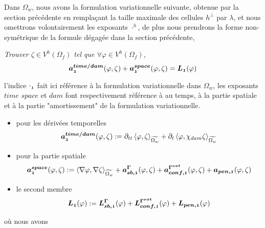 \noindent Dans $\Omega_w$, nous avons la formulation variationnelle suivante, obtenue par la section précédente en remplaçant la taille maximale des cellules $h^{\perp}$ par $\lambda$, et nous omettrons volontairement les exposants $\cdot^h$, de plus nous prendrons la forme non-symétrique de la formule dégagée dans la section précédente,

\begin{refe}
\noindent \textit{Trouver $\zeta\in V^h (\Omega_f)$ tel que $\forall \varphi \in V^h (\Omega_f)$,}
	\begin{equation}
	\boldsymbol{a^{time/dam}_{\mathfrak{1}}}(\varphi, \zeta) + \boldsymbol{a^{space}_{\mathfrak{1}}}(\varphi, \zeta) = \boldsymbol{L_{\mathfrak{1}}}(\varphi)
	\end{equation}
\end{refe}
l'indice $\cdot_{\mathfrak{1}}$ fait ici référence à la formulation variationnelle dans $\Omega_w$, les exposants $time$ $space$ et $dam$ font respectivement référence à au temps, à la partie spatiale et à la partie "amortissement" de la formulation variationnelle.
\begin{itemize}[label=$\mybullet$]
\item pour les dérivées temporelles
\begin{equation}
	\boldsymbol{a^{time/dam}_{\mathfrak{1}}}(\varphi, \zeta):=\partial_{tt}\left<\varphi,\zeta\right>_{\widetilde{\Omega_w}} + \partial_{t}\left<\varphi,\chi_{dam}\zeta\right>_{\widetilde{\Omega_w}}\label{eq:a_time_dam_1}
\end{equation}
\item pour la partie spatiale
\begin{equation}
\boldsymbol{a^{space}_{\mathfrak{1}}}(\varphi, \zeta) := \left<\nabla \varphi,\nabla \zeta\right>_{\widetilde{\Omega_w}} + \boldsymbol{a_{sb, \mathfrak{1}}^{\Gamma}} (\varphi, \zeta) + \boldsymbol{a_{conf, \mathfrak{1}}^{\Gamma^{ext}}} (\varphi, \zeta) + \boldsymbol{a_{pen, \mathfrak{1}}} (\varphi, \zeta)\label{eq:a_space_1}
\end{equation}
\item le second membre
\begin{equation}
	\boldsymbol{L_{\mathfrak{1}}}(\varphi) := \boldsymbol{L_{sb, \mathfrak{1}}^{\Gamma}}(\varphi) + \boldsymbol{L_{conf,\mathfrak{1}}^{\Gamma^{ext}}} (\varphi) + \boldsymbol{L_{pen, \mathfrak{1}}}(\varphi)\label{eq:L_1}
\end{equation}
\end{itemize}
où nous avons
